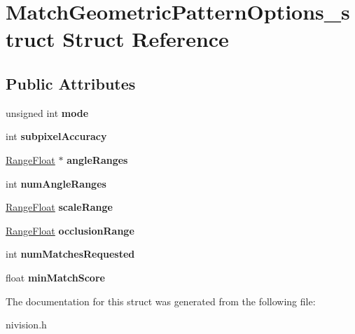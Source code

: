 \hypertarget{structMatchGeometricPatternOptions__struct}{
\section{MatchGeometricPatternOptions\_\-struct Struct Reference}
\label{structMatchGeometricPatternOptions__struct}
}
\subsection*{Public Attributes}
\begin{DoxyCompactItemize}
\item 
\hypertarget{structMatchGeometricPatternOptions__struct_a6280e73966043d63d2db9a51d927fbbe}{
unsigned int {\bfseries mode}}
\label{structMatchGeometricPatternOptions__struct_a6280e73966043d63d2db9a51d927fbbe}

\item 
\hypertarget{structMatchGeometricPatternOptions__struct_a456598efd9e15e3d7ec8fcf76ee3457e}{
int {\bfseries subpixelAccuracy}}
\label{structMatchGeometricPatternOptions__struct_a456598efd9e15e3d7ec8fcf76ee3457e}

\item 
\hypertarget{structMatchGeometricPatternOptions__struct_ab93ab5bd708b2a1444a4840ab736fcc2}{
\hyperlink{structRangeFloat__struct}{RangeFloat} $\ast$ {\bfseries angleRanges}}
\label{structMatchGeometricPatternOptions__struct_ab93ab5bd708b2a1444a4840ab736fcc2}

\item 
\hypertarget{structMatchGeometricPatternOptions__struct_a7e4ba240ee32d9224e6c54c4f63d2cea}{
int {\bfseries numAngleRanges}}
\label{structMatchGeometricPatternOptions__struct_a7e4ba240ee32d9224e6c54c4f63d2cea}

\item 
\hypertarget{structMatchGeometricPatternOptions__struct_a21a909990685cd1340726b88b93e4cfe}{
\hyperlink{structRangeFloat__struct}{RangeFloat} {\bfseries scaleRange}}
\label{structMatchGeometricPatternOptions__struct_a21a909990685cd1340726b88b93e4cfe}

\item 
\hypertarget{structMatchGeometricPatternOptions__struct_a168ed50b5552267d140d8bb26da2ea3f}{
\hyperlink{structRangeFloat__struct}{RangeFloat} {\bfseries occlusionRange}}
\label{structMatchGeometricPatternOptions__struct_a168ed50b5552267d140d8bb26da2ea3f}

\item 
\hypertarget{structMatchGeometricPatternOptions__struct_a6e34184af01091516567464962fa055c}{
int {\bfseries numMatchesRequested}}
\label{structMatchGeometricPatternOptions__struct_a6e34184af01091516567464962fa055c}

\item 
\hypertarget{structMatchGeometricPatternOptions__struct_a188106b7772a9e11e76fef0b3a254eb0}{
float {\bfseries minMatchScore}}
\label{structMatchGeometricPatternOptions__struct_a188106b7772a9e11e76fef0b3a254eb0}

\end{DoxyCompactItemize}


The documentation for this struct was generated from the following file:\begin{DoxyCompactItemize}
\item 
nivision.h\end{DoxyCompactItemize}
